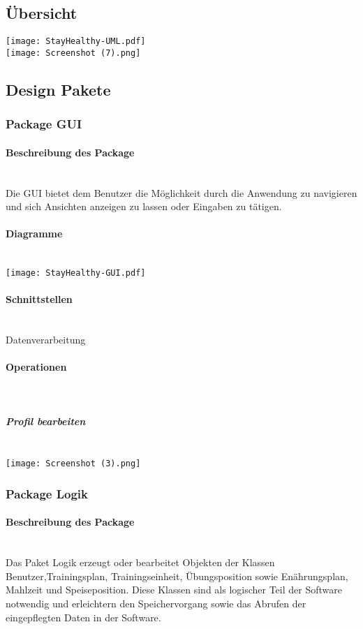 \documentclass[12pt,a4paper,onecolumn]{article}
\begin{document}
\subsection{Übersicht}
\texttt{[image: StayHealthy-UML.pdf]}\\
\texttt{[image: Screenshot (7).png]}

\subsection{Design Pakete}
\subsubsection{Package GUI}
\paragraph{Beschreibung des Package}\mbox{}\\
Die GUI bietet dem Benutzer die Möglichkeit durch die Anwendung zu navigieren und sich Ansichten anzeigen zu lassen oder Eingaben zu tätigen.
\paragraph{Diagramme}\mbox{}\\
\texttt{[image: StayHealthy-GUI.pdf]}
\paragraph{Schnittstellen}\mbox{}\\
Datenverarbeitung
\paragraph{Operationen}\mbox{}\\
\subparagraph{Profil bearbeiten}\mbox{}\\
\texttt{[image: Screenshot (3).png]}

\subsubsection{Package Logik}
\paragraph{Beschreibung des Package}\mbox{}\\
Das Paket Logik erzeugt oder bearbeitet Objekten der Klassen Benutzer,Trainingsplan, Trainingseinheit, Übungsposition sowie Enährungsplan, Mahlzeit und Speiseposition. Diese Klassen sind als logischer Teil der Software notwendig und erleichtern den Speichervorgang sowie das Abrufen der eingepflegten Daten in der Software.
\end{document}
